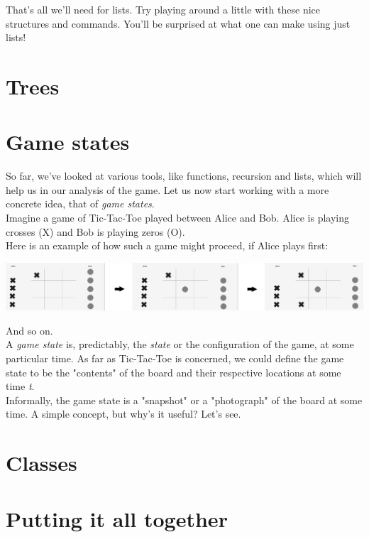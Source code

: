 \documentclass{article}
\begin{document}
\noindent That's all we'll need for lists. Try playing around a little with these nice structures and commands. You'll be surprised at what one can make using just lists!

\section{Trees}

\section{Game states} 

So far, we've looked at various tools, like functions, recursion and lists,
which will help us in our analysis of the game. Let us now start working with
a more concrete idea, that of \textit{game states}. \\

\noindent Imagine a game of Tic-Tac-Toe played between Alice and Bob. Alice is playing crosses (X) and Bob is playing zeros (O). \\

\noindent Here is an example of how such a game might proceed, if Alice plays first:

\begin{center}
    \includegraphics[scale=0.11]{AliceVBob}
\end{center}

\noindent And so on. \\

\noindent A \textit{game state} is, predictably, the \textit{state} or the configuration of the game, at some particular time. As far as Tic-Tac-Toe is concerned, we could define the game state to be the "contents" of the board and their respective locations at some time \textit{t}. \\

\noindent Informally, the game state is a "snapshot" or a "photograph" of the board at some time. A simple concept, but why's it useful? Let's see. 

\section{Classes}

\section{Putting it all together}
\end{document}
